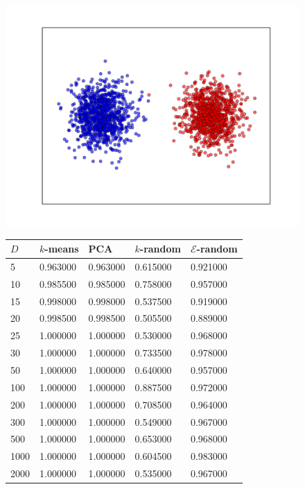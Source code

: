 \documentclass[aps,preprint,nofootinbib,floatfix]{revtex4-1}
\begin{document}
\begin{figure}
\begin{minipage}{.49\textwidth}
\centering
\includegraphics[scale=.45]{30d_more_signal_guass.pdf}
\end{minipage}
\begin{minipage}{.5\textwidth}
\renewcommand*{\arraystretch}{.3}
\begin{tabular}{l l l l l}
\hline
$D$ & $k$-means & PCA & $k$-random & $\mathcal{E}$-random \\
\hline
%
5 & 0.963000 & 0.963000 & 0.615000 & 0.921000 \\
10 & 0.985500 & 0.985000 & 0.758000 & 0.957000 \\
15 & 0.998000 & 0.998000 & 0.537500 & 0.919000 \\
20 & 0.998500 & 0.998500 & 0.505500 & 0.889000 \\
25 & 1.000000 & 1.000000 & 0.530000 & 0.968000 \\
30 & 1.000000 & 1.000000 & 0.733500 & 0.978000 \\
50 & 1.000000 & 1.000000 & 0.640000 & 0.957000 \\
100 & 1.000000 & 1.000000 & 0.887500 & 0.972000 \\
200 & 1.000000 & 1.000000 & 0.708500 & 0.964000 \\
300 & 1.000000 & 1.000000 & 0.549000 & 0.967000 \\
500 & 1.000000 & 1.000000 & 0.653000 & 0.968000 \\
1000 & 1.000000 & 1.000000 & 0.604500 & 0.983000 \\
2000 & 1.000000 & 1.000000 & 0.535000 & 0.967000 \\

\end{tabular}
\end{minipage}
\end{figure}
\end{document}
